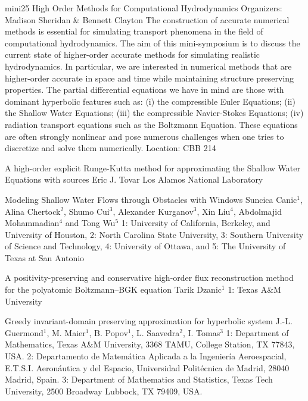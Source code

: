 \mini
{mini25}
{High Order Methods for Computational Hydrodynamics}
{Organizers: Madison Sheridan \& Bennett Clayton}
{The construction of accurate numerical methods is essential for simulating transport phenomena in the field of computational hydrodynamics. The aim of this mini-symposium is to discuss the current state of higher-order accurate methods for simulating realistic hydrodynamics. In particular, we are interested in numerical methods that are higher-order accurate in space and time while maintaining structure preserving properties. The partial differential equations we have in mind are those with dominant hyperbolic features such as: (i) the compressible Euler Equations; (ii) the Shallow Water Equations; (iii) the compressible Navier-Stokes Equations; (iv) radiation transport equations such as the Boltzmann Equation. These equations are often strongly nonlinear and pose numerous challenges when one tries to discretize and solve them numerically.}
{Location: CBB 214}

\begin{talks}
\item\talk
{A high-order explicit Runge-Kutta method for approximating the Shallow Water Equations with sources}
{Eric J. Tovar}
{Los Alamos National Laboratory}
\item\talk
{Modeling Shallow Water Flows through Obstacles with Windows}
{Suncica Canic$^{1}$, Alina Chertock$^{2}$, Shumo Cui$^{3}$, Alexander Kurganov$^{3}$, Xin Liu$^{4}$, Abdolmajid Mohammadian$^{4}$ and Tong Wu$^{5}$}
{1: University of California, Berkeley, and University of Houston, 2: North Carolina State University, 3: Southern University of Science and Technology, 4: University of Ottawa, and 5: The University of Texas at San Antonio}
\item\talk
{A positivity-preserving and conservative high-order flux reconstruction method for the polyatomic Boltzmann–BGK equation}
{Tarik Dzanic$^{1}$}
{1: Texas A\&M University}
\item\talk
{Greedy invariant-domain preserving approximation for hyperbolic system}
{J.-L. Guermond$^1$, M. Maier$^1$, B. Popov$^1$, L. Saavedra$^2$, I. Tomas$^3$}
{1: Department of Mathematics, Texas A\&M University, 3368
	TAMU, College Station, TX 77843, USA.
	2: Departamento de Matem\'atica Aplicada a la Ingenier\'ia
	Aeroespacial, E.T.S.I. Aeron\'autica y del Espacio, Universidad
	Polit\'ecnica de Madrid, 28040 Madrid, Spain.
	3: Department of Mathematics and Statistics,
	Texas Tech University, 2500 Broadway Lubbock,
	TX 79409, USA.}
\end{talks}
\room
